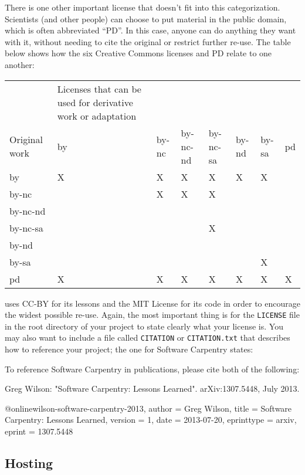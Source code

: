There is one other important license that doesn't fit into this
categorization. Scientists (and other people) can choose to put material
in the public domain, which is often abbreviated ``PD''. In this case,
anyone can do anything they want with it, without needing to cite the
original or restrict further re-use. The table below shows how the six
Creative Commons licenses and PD relate to one another:

\begin{tabular}{llllllll}
& Licenses that can be used for derivative work or adaptation \\
Original work & by & by-nc & by-nc-nd & by-nc-sa & by-nd & by-sa & pd \\
by & X & X & X & X & X & X & \\
by-nc & & X & X & X & & & \\
by-nc-nd & & & & & & & \\
by-nc-sa & & & & X & & & \\
by-nd & & & & & & & \\
by-sa & & & & & & X & \\
pd & X & X & X & X & X & X & X \\
\end{tabular}

uses CC-BY for its lessons and the MIT License for its code in order to
encourage the widest possible re-use. Again, the most important thing is
for the \texttt{LICENSE} file in the root directory of your project to
state clearly what your license is. You may also want to include a file
called \texttt{CITATION} or \texttt{CITATION.txt} that describes how to
reference your project; the one for Software Carpentry states:

\begin{VerbFile}
To reference Software Carpentry in publications, please cite both of the following:

Greg Wilson: "Software Carpentry: Lessons Learned". arXiv:1307.5448, July 2013.

@online{wilson-software-carpentry-2013,
  author      = {Greg Wilson},
  title       = {Software Carpentry: Lessons Learned},
  version     = {1},
  date        = {2013-07-20},
  eprinttype  = {arxiv},
  eprint      = {1307.5448}
}
\end{VerbFile}

\subsection*{Hosting}

